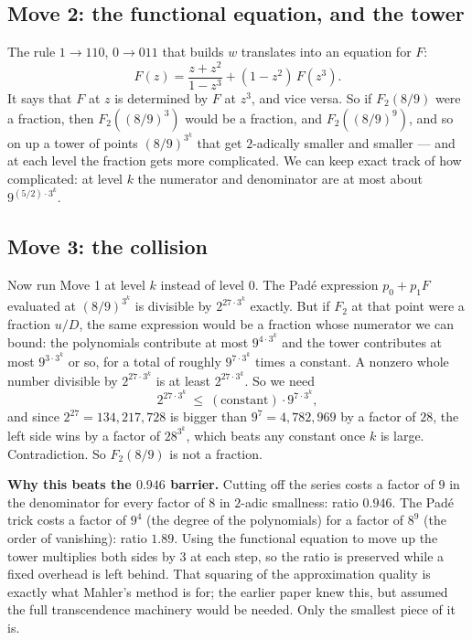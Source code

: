 \documentclass[11pt]{article}
\begin{document}
\subsection*{Move 2: the functional equation, and the tower}

The rule $1 \to 110$, $0 \to 011$ that builds $w$ translates into an
equation for $F$:
\[
F(z) = \frac{z + z^2}{1 - z^3} + (1 - z^2)\, F(z^3).
\]
It says that $F$ at $z$ is determined by $F$ at $z^3$, and vice versa.
So if $F_2(8/9)$ were a fraction, then $F_2((8/9)^3)$ would be a
fraction, and $F_2((8/9)^9)$, and so on up a tower of points
$(8/9)^{3^k}$ that get $2$-adically smaller and smaller --- and at each
level the fraction gets more complicated. We can keep exact track of
how complicated: at level $k$ the numerator and denominator are at
most about $9^{(5/2)\cdot 3^k}$.

\subsection*{Move 3: the collision}

Now run Move 1 at level $k$ instead of level $0$. The Pad\'e expression
$p_0 + p_1 F$ evaluated at $(8/9)^{3^k}$ is divisible by $2^{27 \cdot
3^k}$ exactly. But if $F_2$ at that point were a fraction $u/D$, the
same expression would be a fraction whose numerator we can bound:
the polynomials contribute at most $9^{4 \cdot 3^k}$ and the tower
contributes at most $9^{3 \cdot 3^k}$ or so, for a total of roughly
$9^{7 \cdot 3^k}$ times a constant. A nonzero whole number divisible
by $2^{27 \cdot 3^k}$ is at least $2^{27 \cdot 3^k}$. So we need
\[
2^{27 \cdot 3^k} \ \le\ (\text{constant}) \cdot 9^{7 \cdot 3^k},
\]
and since $2^{27} = 134{,}217{,}728$ is bigger than $9^7 = 4{,}782{,}969$
by a factor of $28$, the left side wins by a factor of $28^{3^k}$,
which beats any constant once $k$ is large. Contradiction. So
$F_2(8/9)$ is not a fraction.

\begin{keyidea}
\textbf{Why this beats the $0.946$ barrier.} Cutting off the series
costs a factor of $9$ in the denominator for every factor of $8$ in
$2$-adic smallness: ratio $0.946$. The Pad\'e trick costs a factor of
$9^4$ (the degree of the polynomials) for a factor of $8^9$ (the order
of vanishing): ratio $1.89$. Using the functional equation to move up
the tower multiplies both sides by $3$ at each step, so the ratio is
preserved while a fixed overhead is left behind. That squaring of the
approximation quality is exactly what Mahler's method is for; the
earlier paper knew this, but assumed the full transcendence machinery
would be needed. Only the smallest piece of it is.
\end{keyidea}
\end{document}
